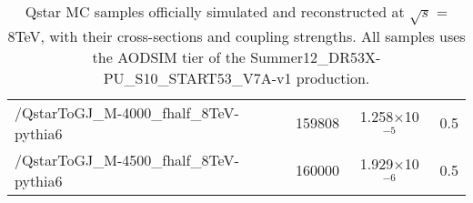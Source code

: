 \begin{table}[h!]
\begin{center}
{\begin{tabular}{|l|c|c|c|}
/QstarToGJ\_M-4000\_fhalf\_8TeV-pythia6 & 159808 & 1.258$\times$10$^{-5}$& 0.5 \\
/QstarToGJ\_M-4500\_fhalf\_8TeV-pythia6 & 160000 & 1.929$\times$10$^{-6}$& 0.5 \\
\hline
\end{tabular}
}
\caption{Qstar MC samples officially simulated and reconstructed at $\sqrt{s}$ = 8TeV, with their cross-sections and coupling strengths. All samples uses the AODSIM tier of the Summer12\_DR53X-PU\_S10\_START53\_V7A-v1 production.}
   \label{Table:SigSamples}
\end{center}
\end{table}
